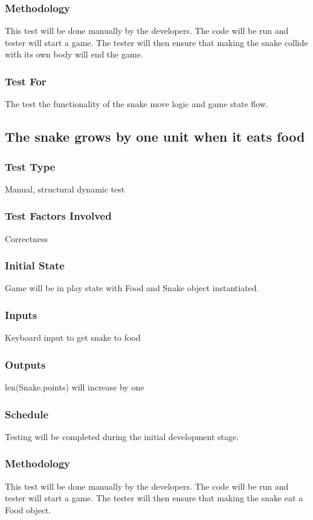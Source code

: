 \documentclass[12pt]{article}
\begin{document}
\subsubsection*{Methodology}
This test will be done manually by the developers. The code will be run and tester will start a game. The tester will then ensure that making the snake collide with its own body will end the game.
\subsubsection*{Test For}
The test the functionality of the snake move logic and game state flow. \newline

\noindent
\subsection{The snake grows by one unit when it eats food}
\subsubsection*{Test Type}
Manual, structural dynamic test
\subsubsection*{Test Factors Involved}
Correctness
\subsubsection*{Initial State}
Game will be in play state with Food and Snake object instantiated.
\subsubsection*{Inputs}
Keyboard input to get snake to food
\subsubsection*{Outputs}
len(Snake.points) will increase by one
\subsubsection*{Schedule}
Testing will be completed during the initial development stage.
\subsubsection*{Methodology}
This test will be done manually by the developers. The code will be run and tester will start a game. The tester will then ensure that making the snake eat a Food object.
\end{document}
